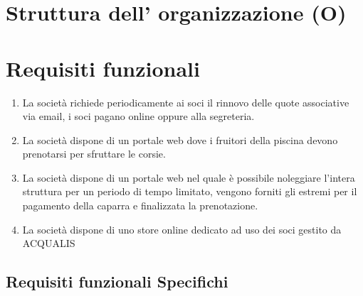 \documentclass[11pt]{article} %
\begin{document}
\section{Struttura dell' organizzazione (O)}

\section{Requisiti funzionali}

\begin{enumerate}
	\item La società richiede periodicamente ai soci il rinnovo delle quote associative via email, i soci pagano online oppure alla segreteria.
	\item La società dispone di un portale web dove i fruitori della piscina devono prenotarsi per sfruttare le corsie.
	\item La società dispone di un portale web nel quale è possibile noleggiare l'intera struttura per un periodo di tempo limitato, vengono forniti gli estremi per il pagamento della caparra e finalizzata la prenotazione.
	\item La società dispone di uno store online dedicato ad uso dei soci gestito da ACQUALIS
\end{enumerate}

\subsection{Requisiti funzionali Specifichi}
\end{document}
